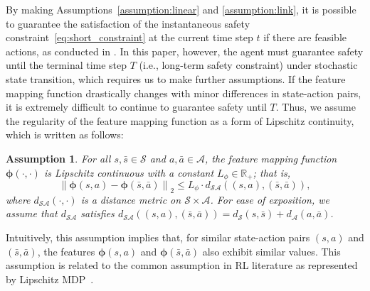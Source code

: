 \documentclass[letterpaper]{article} %
\newtheorem{assumption}{Assumption}
\newcommand{\R}{\mathbb{R}}
\newcommand{\cA}{\mathcal{A}}
\newcommand{\cS}{\mathcal{S}}
\newcommand{\bphi}{\bm{\phi}}
\newcommand{\norm}[1]{\left\|{#1}\right\|_2}
\begin{document}
By making Assumptions~\ref{assumption:linear} and \ref{assumption:link}, it is possible to guarantee the satisfaction of the instantaneous safety constraint~\eqref{eq:short_constraint} at the current time step $t$ if there are feasible actions, as conducted in \citet{wachi2021safe}.
In this paper, however, the agent must guarantee safety until the terminal time step $T$ (i.e., long-term safety constraint) under stochastic state transition, which requires us to make further assumptions.
If the feature mapping function drastically changes with minor differences in state-action pairs, it is extremely difficult to continue to guarantee safety until $T$.
Thus, we assume the regularity of the feature mapping function as a form of Lipschitz continuity, which is written as follows:
%
\begin{assumption}
\label{assumption:lipschitz_feature}
For all $s, \bar{s} \in \cS$ and $a, \bar{a} \in \cA$, the feature mapping function $\bphi(\cdot, \cdot)$ is Lipschitz continuous with a constant $L_\phi \in \R_{+}$; that is,
%
\begin{equation}
    \norm{\bphi(s, a) - \bphi(\bar{s}, \bar{a})} \le L_\phi \cdot d_{\cS\cA}((s, a), (\bar{s}, \bar{a})),
\end{equation}
%
where $d_{\cS\cA}(\cdot, \cdot)$ is a distance metric on $\cS \times\cA$.
For ease of exposition, we assume that $d_{\cS\cA}$ satisfies $d_{\cS\cA}((s, a), (\bar{s}, \bar{a})) = d_\cS(s, \bar{s}) + d_\cA(a, \bar{a})$.
\end{assumption}
%
\noindent
Intuitively, this assumption implies that, for similar state-action pairs $(s,a)$ and $(\bar{s}, \bar{a})$, the features $\bphi(s, a)$ and $\bphi(\bar{s}, \bar{a})$ also exhibit similar values.
This assumption is related to the common assumption in RL literature as represented by Lipschitz MDP~\cite{asadi2018lipschitz,ok2018exploration}.
\end{document}
